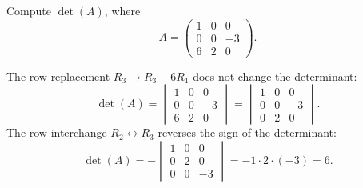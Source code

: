 \documentclass{ximera}
\begin{document}
\begin{example}
  Compute $\det(A)$, where
  \[
    A =
    \begin{pmatrix}
      1 & 0 & 0 \\
      0 & 0 & -3 \\
      6 & 2 & 0
    \end{pmatrix}.
  \]
  \begin{explanation}
    The row replacement $R_3 \to R_3 - 6R_1$ does not change the
    determinant:
    \[
      \det(A) =
      \begin{vmatrix}
        1 & 0 & 0 \\
        0 & 0 & -3 \\
        6 & 2 & 0
      \end{vmatrix}
      =
      \begin{vmatrix}
        1 & 0 & 0 \\
        0 & 0 & -3 \\
        0 & 2 & 0
      \end{vmatrix}.
    \]
    The row interchange $R_2 \leftrightarrow R_3$ reverses the sign of the
    determinant:
    \[
      \det(A) = -
      \begin{vmatrix}
        1 & 0 & 0 \\
        0 & 2 & 0 \\
        0 & 0 & -3
      \end{vmatrix}
      = - 1 \cdot 2 \cdot (-3) = 6.
    \]
  \end{explanation}
\end{example}
\end{document}
